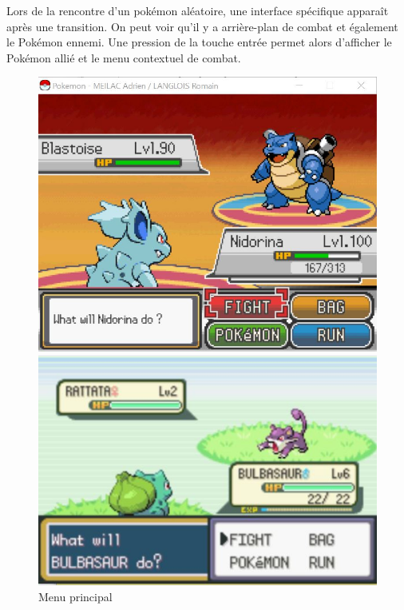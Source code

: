 Lors de la rencontre d'un pokémon aléatoire, une interface spécifique apparaît après une transition. On peut voir qu'il y a arrière-plan de combat et également le Pokémon ennemi. Une pression de la touche entrée permet alors d'afficher le Pokémon allié et le menu contextuel de combat.

\begin{figure}[!h]
\begin{minipage}{0.49\textwidth}
\includegraphics[scale = 0.6]{../Images/mainMenu.jpg}
\end{minipage}
\begin{minipage}{0.49\textwidth}
\includegraphics[scale = 0.84]{../Images/vrai_jeu_mainMenu.jpg}
\end{minipage}
\caption{Menu principal}
\end{figure}


